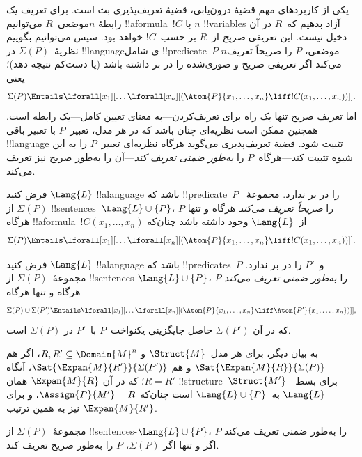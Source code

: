 \documentclass[../../../include/open-logic-section]{subfiles}
\begin{document}


یکی از کاربردهای مهم قضیهٔ درون‌یابی، قضیهٔ تعریف‌پذیری بث است. برای
تعریف یک رابطهٔ $n$موضعی~$R$ می‌توانیم !!a{formula}~$!C$ با $n$
!!{variable}s آزاد بدهیم که~$R$ در آن دخیل نیست. این تعریفی
\emph{صریح} از~$R$ بر حسب~$!C$ خواهد بود. سپس می‌توانیم بگوییم
نظریهٔ~$\Sigma(P)$ در !!{language}ی شامل !!{predicate}~$P$
$n$موضعی، $P$ را صریحاً تعریف می‌کند اگر تعریفی صریح و صوری‌شده را در
بر داشته باشد (یا دست‌کم نتیجه دهد)؛ یعنی
\[
\Sigma(P) \Entails \lforall[x_1][\dots
  \lforall[x_n][(\Atom{P}{x_1,\dots, x_n} \liff !C(x_1, \dots,
    x_n))]].
\]
اما تعریف صریح تنها یک راه برای تعریف‌کردن---به معنای تعیین کامل---یک
رابطه است. همچنین ممکن است نظریه‌ای چنان باشد که در هر مدل، تعبیر~$P$
با تعبیر باقی !!{language} تثبیت شود. قضیهٔ تعریف‌پذیری می‌گوید هرگاه
نظریه‌ای تعبیر~$P$ را به این شیوه تثبیت کند---هرگاه~$P$ را
\emph{به‌طور ضمنی تعریف کند}---آن را به‌طور صریح نیز تعریف می‌کند.

\begin{defn}
فرض کنید $\Lang{L}$ !!a{language} باشد که !!{predicate}~$P$ را در بر
ندارد. مجموعهٔ~$\Sigma(P)$ از !!{sentence}s~$\Lang{L} \cup \{P\}$،
$P$ را \emph{صریحاً تعریف می‌کند} هرگاه و تنها هرگاه
!!a{formula}~$!C(x_1, \dots, x_n)$ از~$\Lang{L}$ وجود داشته باشد
چنان‌که
\[
\Sigma(P) \Entails \lforall[x_1][\dots
  \lforall[x_n][(\Atom{P}{x_1,\dots, x_n} \liff !C(x_1, \dots,
    x_n))]].
\]
\end{defn}

\begin{defn}
فرض کنید $\Lang{L}$ !!a{language} باشد که !!{predicate}s~$P$ و~$P'$
را در بر ندارد. مجموعهٔ~$\Sigma(P)$ از !!{sentence}s
$\Lang{L} \cup \{P\}$، $P$ را \emph{به‌طور ضمنی تعریف می‌کند}
هرگاه و تنها هرگاه
\[
\Sigma(P) \cup \Sigma(P') \Entails \lforall[x_1][\dots
  \lforall[x_n][(\Atom{P}{x_1,\dots, x_n} \liff \Atom{P'}{x_1,\dots,
      x_n})]],
\]
که در آن $\Sigma(P')$ حاصل جایگزینی یکنواخت~$P$ با~$P'$ در
$\Sigma(P)$ است.
\end{defn}

به بیان دیگر، برای هر مدل~$\Struct{M}$ و
$R, R' \subseteq \Domain{M}^n$، اگر هم
$\Sat{\Expan{M}{R}}{\Sigma(P)}$ و هم
$\Sat{\Expan{M}{R'}}{\Sigma(P')}$، آنگاه $R=R'$؛ که در آن
$\Expan{M}{R}$ همان !!{structure}~$\Struct{M'}$ برای بسط~$\Lang{L}$
به~$\Lang{L} \cup \{P\}$ است چنان‌که $\Assign{P}{M'} = R$، و برای
$\Expan{M}{R'}$ نیز به همین ترتیب.

\begin{thm} مجموعهٔ~$\Sigma(P)$ از
  !!{sentence}s-$\Lang{L} \cup\{P\}$، $P$ را به‌طور ضمنی تعریف می‌کند
  اگر و تنها اگر $\Sigma(P)$، $P$ را به‌طور صریح تعریف کند.
\end{thm}
\end{document}
